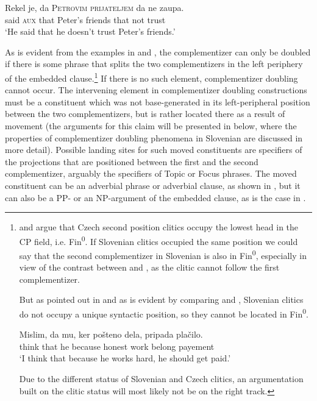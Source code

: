 \documentclass[output=paper,
]{langscibook}
\begin{document}
\begin{exe} 
\ex \label{ex:plesnicar:two}
\gll Rekel	je,	da	\textsc{Petrovim}	\textsc{prijateljem}	da	ne	zaupa. \\
	said	\textsc{aux}	that	Peter’s		friends	that	not	trust\\
\trans `He said that he doesn’t trust Peter’s friends.' 
\end{exe}

\noindent\largerpage
As is evident from the examples in  and , the complementizer can only be doubled if there is some phrase that splits the two complementizers in the left periphery of the embedded clause.\footnote{\cite{lenertova2001} and \cite{Veselovská2008} argue that Czech second position clitics occupy the lowest head in the CP field, i.e. Fin\textsuperscript{0}. If Slovenian clitics occupied the same position we could say that the second complementizer in Slovenian is also in Fin\textsuperscript{0}, especially in view of the contrast between  and , as the clitic cannot follow the first complementizer. 

\z

\noindent But as pointed out in \cite{marusic2008} and as is evident by comparing  and , Slovenian clitics do not occupy a unique syntactic position, so they cannot be located in Fin\textsuperscript{0}. 

\begin{exe} 
\ex \label{ex:plesnicar:embtwo}
\gll Mislim, 	da 	mu, 	ker 	pošteno 	dela, 	pripada 	plačilo. \\
	think	that	he	because	honest	work	belong	payement\\
\trans `I think that because he works hard, he should get paid.' 
\end{exe}

\noindent Due to the different status of Slovenian and Czech clitics, an argumentation built on the clitic status will most likely not be on the right track.} If there is no such element, complementizer doubling cannot occur. The intervening element in complementizer doubling constructions must be a constituent which was not base-generated in its left-peripheral position between the two complementizers, but is rather located there as a result of movement (the arguments for this claim will be presented in  below, where the properties of complementizer doubling phenomena in Slovenian are discussed in more detail). Possible landing sites for such moved constituents are specifiers of the projections that are positioned between the first and the second complementizer, arguably the specifiers of Topic or Focus phrases. The moved constituent can be an adverbial phrase or adverbial clause, as shown in , but it can also be a PP- or an NP-argument of the embedded clause, as is the case in . 
\end{document}
